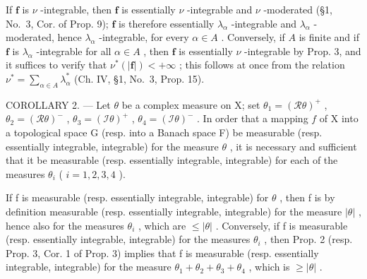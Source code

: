 If \(\mathbf{f}\) is \(\nu\) -integrable, then \(\mathbf{f}\) is essentially \(\nu\) -integrable and \(\nu\) -moderated (§1, No.~3, Cor. of Prop. 9); \(\mathbf{f}\) is therefore essentially \(\lambda_{\alpha}\) -integrable and \(\lambda_{\alpha}\) -moderated, hence \(\lambda_{\alpha}\) -integrable, for every \(\alpha \in A\) . Conversely, if \(A\) is finite and if \(\mathbf{f}\) is \(\lambda_{\alpha}\) -integrable for all \(\alpha \in A\) , then \(\mathbf{f}\) is essentially \(\nu\) -integrable by Prop. 3, and it suffices to verify that \(\nu^{*}(|\mathbf{f}|) < +\infty\) ; this follows at once from the relation \(\nu^{*} = \sum_{\alpha \in A} \lambda_{\alpha}^{*}\) (Ch. IV, §1, No.~3, Prop. 15).

COROLLARY 2. --- Let \(\theta\) be a complex measure on X; set \(\theta_1 = (\mathcal{R}\theta)^+\) , \(\theta_2 = (\mathcal{R}\theta)^-\) , \(\theta_3 = (\mathcal{I}\theta)^+\) , \(\theta_4 = (\mathcal{I}\theta)^-\) . In order that a mapping \(f\) of X into a topological space G (resp. into a Banach space F) be measurable (resp. essentially integrable, integrable) for the measure \(\theta\) , it is necessary and sufficient that it be measurable (resp. essentially integrable, integrable) for each of the measures \(\theta_i\) ( \(i = 1,2,3,4\) ).

If f is measurable (resp. essentially integrable, integrable) for \(\theta\) , then f is by definition measurable (resp. essentially integrable, integrable) for the measure \(|\theta|\) , hence also for the measures \(\theta_{i}\) , which are \(\leqslant |\theta|\) . Conversely, if f is measurable (resp. essentially integrable, integrable) for the measures \(\theta_{i}\) , then Prop. 2 (resp. Prop. 3, Cor. 1 of Prop. 3) implies that f is measurable (resp. essentially integrable, integrable) for the measure \(\theta_{1} + \theta_{2} + \theta_{3} + \theta_{4}\) , which is \(\geqslant |\theta|\) .

